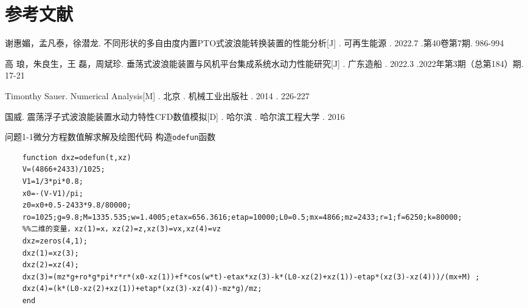 \documentclass{article}
\numberwithin{equation}{subsection}
\begin{document}
{\centering\section{参考文献}}
\begingroup  %
\renewcommand{\section}[2]{}
\begin{thebibliography}{99}
    
谢惠媚，孟凡泰，徐潜龙. 不同形状的多自由度内置PTO式波浪能转换装置的性能分析[J] . 可再生能源 . 2022.7 .第40卷第7期. 986-994

高 琅，朱良生，王 磊，周斌珍. 垂荡式波浪能装置与风机平台集成系统水动力性能研究[J] . 广东造船 . 2022.3 .2022年第3期（总第184）期. 17-21

Timonthy Sauer. Numerical Analysis[M] . 北京 . 机械工业出版社 . 2014 . 226-227

国威. 震荡浮子式波浪能装置水动力特性CFD数值模拟[D] . 哈尔滨 . 哈尔滨工程大学 . 2016





\end{thebibliography}
\endgroup

\newpage



{\centering\section*{附录}}
\appendix
\section{问题一相关数据及代码}

\subsection{问题1-1微分方程数值解求解及绘图代码}
构造\verb|odefun|函数
\begin{lstlisting}
    function dxz=odefun(t,xz)
    V=(4866+2433)/1025; 
    V1=1/3*pi*0.8; 
    x0=-(V-V1)/pi;
    z0=x0+0.5-2433*9.8/80000;
    ro=1025;g=9.8;M=1335.535;w=1.4005;etax=656.3616;etap=10000;L0=0.5;mx=4866;mz=2433;r=1;f=6250;k=80000;
    %%二维的变量，xz(1)=x，xz(2)=z,xz(3)=vx,xz(4)=vz 
    dxz=zeros(4,1); 
    dxz(1)=xz(3); 
    dxz(2)=xz(4);
    dxz(3)=(mz*g+ro*g*pi*r*r*(x0-xz(1))+f*cos(w*t)-etax*xz(3)-k*(L0-xz(2)+xz(1))-etap*(xz(3)-xz(4)))/(mx+M) ;
    dxz(4)=(k*(L0-xz(2)+xz(1))+etap*(xz(3)-xz(4))-mz*g)/mz; 
    end
\end{lstlisting}
\end{document}
